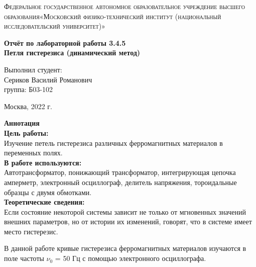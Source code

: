 \documentclass[a4paper, 12pt]{article}%
\begin{document}
	\begin{titlepage}
		\begin{center}
			\textsc{Федеральное государственное автономное образовательное учреждение высшего образования«Московский физико-технический институт (национальный исследовательский университет)»\\[5mm]
			}
			
			\vfill
			
			\textbf{Отчёт по лабораторной работы 3.4.5\\[3mm]
				Петля гистерезиса (динамический метод)
				\\[50mm]
			}
			
		\end{center}
		
		\hfill
		\begin{minipage}{.5\textwidth}
			Выполнил студент:\\[2mm]
			Сериков Василий Романович\\[2mm]
			группа: Б03-102\\[5mm]
			
		\end{minipage}
		\vfill
		\begin{center}
			Москва, 2022 г.
		\end{center}
		
	\end{titlepage}
	
	\newpage
	\textbf{Аннотация}\\
	
	
	\textbf{Цель работы: }\\
	
	Изучение петель гистерезиса различных ферромагнитных материалов в переменных полях.\\
	
	\textbf{В работе используются: }\\
	
	Автотрансформатор, понижающий трансформатор, интегрирующая цепочка амперметр, электронный осциллограф, делитель напряжения, тороидальные образцы с двумя обмотками.\\
	
	\textbf{Теоретические сведения: } \\
	
	Если состояние некоторой системы зависит не только от мгновенных
	значений внешних параметров, но от истории их изменений, говорят, что
	в системе имеет место гистерезис.
	
	В данной работе кривые гистерезиса ферромагнитных материалов изучаются в поле частоты $\nu_0$ = 50 Гц с помощью электронного осциллографа.
	
\end{document}
